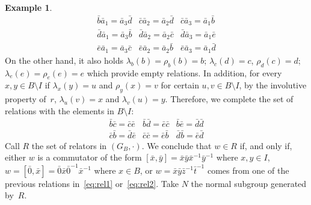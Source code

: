 \documentclass[12pt, a4paper, english]{article}
\theoremstyle{definition}
\newtheorem{exemple}[teorema]{Example}
\theoremstyle{remark}
\begin{document}
\begin{exemple}
\begin{equation}
\begin{array}{lll}
\bar b\bar a_1 = \bar a_3\bar d & \bar c\bar a_2 = \bar a_2\bar d & \bar c\bar a_3 = \bar a_1\bar b\\
\bar d\bar a_1 = \bar a_3\bar b & \bar d\bar a_2 = \bar a_2\bar c & \bar d\bar a_3 = \bar a_1\bar e\\
\bar e\bar a_1 = \bar a_3\bar c & \bar e\bar a_2 = \bar a_2\bar b & \bar e\bar a_3 = \bar a_1\bar d
\end{array}
\end{equation}
On the other hand, it also holds $\lambda_b(b) = \rho_b(b) = b$; $\lambda_c(d) = c$, $\rho_d(c) = d$; $\lambda_e(e) = \rho_e(e) = e$ which provide empty relations. In addition, for every $x,y\in B\setminus I$ if $\lambda_x(y) = u$ and $\rho_y(x) = v$ for certain $u, v\in B\setminus I$, by the involutive property of~$r$, $\lambda_u(v) = x$ and $\lambda_v(u) = y$. Therefore, we complete the set of relations with the elements in $B\setminus I$:
\begin{equation}
\label{eq:rel2}
\begin{array}{lll}
\bar b\bar c = \bar c\bar e & \bar b\bar d = \bar e\bar c & \bar b\bar e = \bar d\bar d\\
\bar c\bar b = \bar d\bar e & \bar c\bar c = \bar e\bar b & \bar d\bar b = \bar e\bar d
\end{array}
\end{equation}
Call $R$ the set of relators in $(G_B,\cdot)$. We conclude that $w \in R$ if, and only if, either $w$ is a commutator of the form $[\bar x,\bar y] = \bar x\bar y\bar x^{-1}\bar y^{-1}$ where $x,y \in I$, $w = [\bar 0,\bar x] = \bar 0\bar x\bar 0^{-1}\bar x^{-1}$ where $x \in B$, or $w = \bar x\bar y\bar z^{-1}\bar t^{-1}$ comes from one of the previous relations in~\eqref{eq:rel1} or~\eqref{eq:rel2}. Take $N$ the normal subgroup generated by~$R$.


\end{exemple}
\end{document}
